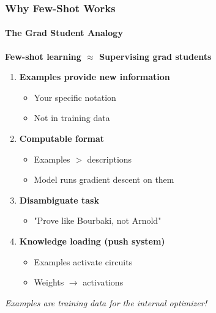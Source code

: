 \documentclass[10pt,aspectratio=169]{beamer}
\begin{document}
\begin{frame}
\frametitle{Why Few-Shot Works}
\framesubtitle{The Grad Student Analogy}

\Large
\textbf{Few-shot learning $\approx$ Supervising grad students}

\vspace{0.5cm}
\normalsize
\begin{enumerate}
    \item \textbf{Examples provide new information}
    \begin{itemize}
        \item Your specific notation
        \item Not in training data
    \end{itemize}
    
    \item \textbf{Computable format}
    \begin{itemize}
        \item Examples $>$ descriptions
        \item Model runs gradient descent on them
    \end{itemize}
    
    \item \textbf{Disambiguate task}
    \begin{itemize}
        \item "Prove like Bourbaki, not Arnold"
    \end{itemize}
    
    \item \textbf{Knowledge loading (push system)}
    \begin{itemize}
        \item Examples activate circuits
        \item Weights $\rightarrow$ activations
    \end{itemize}
\end{enumerate}

\vspace{0.5cm}
\textit{Examples are training data for the internal optimizer!}
\end{frame}

\end{document}
